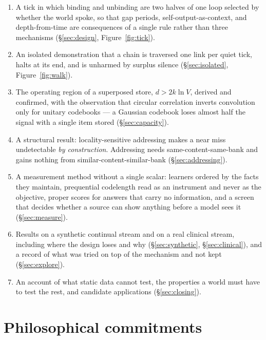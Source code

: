 \documentclass[11pt,a4paper]{article}
\theoremstyle{plain}
\theoremstyle{definition}
\theoremstyle{remark}
\begin{document}
\begin{enumerate}
\item A tick in which binding and unbinding are two halves of one loop selected
by whether the world spoke, so that gap periods, self-output-as-context, and
depth-from-time are consequences of a single rule rather than three mechanisms
(\S\ref{sec:design}, Figure~\ref{fig:tick}).

\item An isolated demonstration that a chain is traversed one link per quiet
tick, halts at its end, and is unharmed by surplus silence
(\S\ref{sec:isolated}, Figure~\ref{fig:walk}).

\item The operating region of a superposed store, $d>2k\ln V$, derived and
confirmed, with the observation that circular correlation inverts convolution
only for unitary codebooks --- a Gaussian codebook loses almost half the signal
with a single item stored (\S\ref{sec:capacity}).

\item A structural result: locality-sensitive addressing makes a near miss
undetectable \emph{by construction}. Addressing needs same-content-same-bank and
gains nothing from similar-content-similar-bank (\S\ref{sec:addressing}).

\item A measurement method without a single scalar: learners ordered by the
facts they maintain, prequential codelength read as an instrument and never as
the objective, proper scores for answers that carry no information, and a screen
that decides whether a source can show anything before a model sees it
(\S\ref{sec:measure}).

\item Results on a synthetic continual stream and on a real clinical stream,
including where the design loses and why (\S\ref{sec:synthetic},
\S\ref{sec:clinical}), and a record of what was tried on top of the mechanism
and not kept (\S\ref{sec:explore}).

\item An account of what static data cannot test, the properties a world must
have to test the rest, and candidate applications (\S\ref{sec:closing}).
\end{enumerate}

\section{Philosophical commitments}
\label{sec:philosophy}
\end{document}
